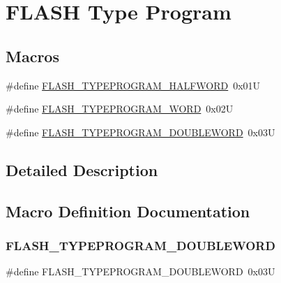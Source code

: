 \hypertarget{group___f_l_a_s_h___type___program}{}\section{F\+L\+A\+SH Type Program}
\label{group___f_l_a_s_h___type___program}
\subsection*{Macros}
\begin{DoxyCompactItemize}
\item 
\#define \hyperlink{group___f_l_a_s_h___type___program_ga2b607dfc2efd463a8530e327bc755582}{F\+L\+A\+S\+H\+\_\+\+T\+Y\+P\+E\+P\+R\+O\+G\+R\+A\+M\+\_\+\+H\+A\+L\+F\+W\+O\+RD}~0x01U
\item 
\#define \hyperlink{group___f_l_a_s_h___type___program_gadd25c6821539030ba6711e7c0d586c3e}{F\+L\+A\+S\+H\+\_\+\+T\+Y\+P\+E\+P\+R\+O\+G\+R\+A\+M\+\_\+\+W\+O\+RD}~0x02U
\item 
\#define \hyperlink{group___f_l_a_s_h___type___program_gabdc2b0b4d2e66c2be90fafbfbf1e225f}{F\+L\+A\+S\+H\+\_\+\+T\+Y\+P\+E\+P\+R\+O\+G\+R\+A\+M\+\_\+\+D\+O\+U\+B\+L\+E\+W\+O\+RD}~0x03U
\end{DoxyCompactItemize}


\subsection{Detailed Description}


\subsection{Macro Definition Documentation}
\mbox{\label{group___f_l_a_s_h___type___program_gabdc2b0b4d2e66c2be90fafbfbf1e225f}} 
\subsubsection{\texorpdfstring{F\+L\+A\+S\+H\+\_\+\+T\+Y\+P\+E\+P\+R\+O\+G\+R\+A\+M\+\_\+\+D\+O\+U\+B\+L\+E\+W\+O\+RD}{FLASH\_TYPEPROGRAM\_DOUBLEWORD}}
{\footnotesize\ttfamily \#define F\+L\+A\+S\+H\+\_\+\+T\+Y\+P\+E\+P\+R\+O\+G\+R\+A\+M\+\_\+\+D\+O\+U\+B\+L\+E\+W\+O\+RD~0x03U}


